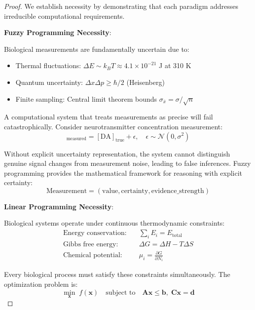 \begin{proof}
We establish necessity by demonstrating that each paradigm addresses irreducible computational requirements.

\textbf{Fuzzy Programming Necessity}:

Biological measurements are fundamentally uncertain due to:
\begin{itemize}
\item Thermal fluctuations: $\Delta E \sim k_B T \approx 4.1 \times 10^{-21}$ J at 310 K
\item Quantum uncertainty: $\Delta x \Delta p \geq \hbar/2$ (Heisenberg)
\item Finite sampling: Central limit theorem bounds $\sigma_{\bar{x}} = \sigma/\sqrt{n}$
\end{itemize}

A computational system that treats measurements as precise will fail catastrophically. Consider neurotransmitter concentration measurement:
\begin{equation}
[\text{DA}]_{\text{measured}} = [\text{DA}]_{\text{true}} + \epsilon, \quad \epsilon \sim \mathcal{N}(0, \sigma^2)
\end{equation}

Without explicit uncertainty representation, the system cannot distinguish genuine signal changes from measurement noise, leading to false inferences. Fuzzy programming provides the mathematical framework for reasoning with explicit certainty:
\begin{equation}
\text{Measurement} = (\text{value}, \text{certainty}, \text{evidence\_strength})
\end{equation}

\textbf{Linear Programming Necessity}:

Biological systems operate under continuous thermodynamic constraints:
\begin{align}
\text{Energy conservation:} \quad &\sum_i E_i = E_{\text{total}} \\
\text{Gibbs free energy:} \quad &\Delta G = \Delta H - T\Delta S \\
\text{Chemical potential:} \quad &\mu_i = \frac{\partial G}{\partial N_i}
\end{align}

Every biological process must satisfy these constraints simultaneously. The optimization problem is:
\begin{equation}
\min_{\mathbf{x}} \; f(\mathbf{x}) \quad \text{subject to} \quad \mathbf{Ax} \leq \mathbf{b}, \; \mathbf{Cx} = \mathbf{d}
\end{equation}


\end{proof}
